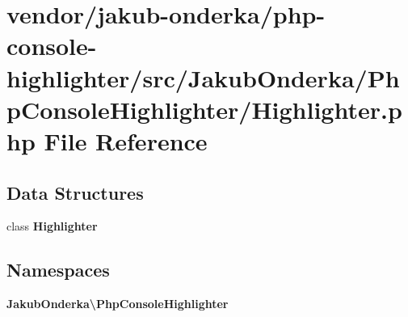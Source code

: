 \section{vendor/jakub-\/onderka/php-\/console-\/highlighter/src/\+Jakub\+Onderka/\+Php\+Console\+Highlighter/\+Highlighter.php File Reference}
\label{_highlighter_8php}
\subsection*{Data Structures}
\begin{DoxyCompactItemize}
\item 
class {\bf Highlighter}
\end{DoxyCompactItemize}
\subsection*{Namespaces}
\begin{DoxyCompactItemize}
\item 
 {\bf Jakub\+Onderka\textbackslash{}\+Php\+Console\+Highlighter}
\end{DoxyCompactItemize}
